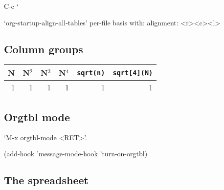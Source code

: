 \documentclass[11pt]{article}
\begin{document}
C-c ` 

‘org-startup-align-all-tables’ 
per-file basis with:
alignment:
<r><c><l>
\subsection{Column groups}
\label{sec:org3e7ee2e}
\begin{center}
\begin{tabular}{r|rrr|rr|}
N & N\(^{\text{2}}\) & N\(^{\text{3}}\) & N\(^{\text{4}}\) & \texttt{sqrt(n)} & \texttt{sqrt[4](N)}\\
\hline
1 & 1 & 1 & 1 & 1 & 1\\
\hline
\end{tabular}
\end{center}
\subsection{Orgtbl mode}
\label{sec:org03f4afb}
‘M-x orgtbl-mode <RET>’.

(add-hook 'message-mode-hook 'turn-on-orgtbl)
\subsection{The spreadsheet}
\label{sec:org24419f4}
\end{document}
